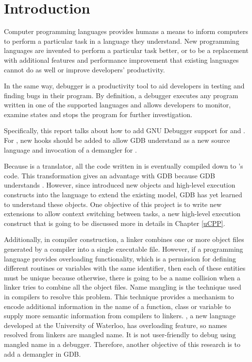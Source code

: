 \chapter{Introduction} \label{introduction}
Computer programming languages provides humans a means to inform computers to
perform a particular task in a language they understand. New programming languages are
invented to perform a particular task better, or to be a replacement with
additional features and performance improvement that existing languages cannot do as well or
improve developers' productivity.

In the same way, debugger is a productivity tool to aid developers in testing
and finding bugs in their program. By definition, a debugger executes
any program written in one of the supported languages and allows developers to
monitor, examine states and stops the program for further investigation.

Specifically, this report talks about how to add GNU Debugger support for \uCPPS
and \CFA.
For \CFA, new hooks should be added to allow GDB understand
\CFAS as a new source language and invocation of a demangler for \CFA.

Because \uCPPS is a translator, all the code written in \uCPPS is eventually
compiled down to \CC's code. This transformation gives \uCPPS an advantage with
GDB because GDB understands \CC. However, since \uCPPS introduced new objects
and high-level execution constructs into the language to extend the existing
model, GDB has yet learned to understand these objects. One objective of this
project is to write new extensions to allow context switching
between tasks, a new high-level execution construct that is going to be discussed more in
details in Chapter \ref{uCPP}.

Additionally, in compiler construction, a linker combines one or more object files generated
by a compiler into a single executable file. However, if a programming
language provides overloading functionality, which is a permission for defining different routines or variables with the
same identifier, then each of these entities must be unique because otherwise,
there is going to be a name collision when a linker tries to combine all the
object files. Name mangling is the technique used in compilers to resolve this
problem. This technique provides a mechanism to encode additional information in the
name of a function, class or variable to supply more semantic information from
compilers to linkers\cite{reference9}. \CFA, a new language developed at the University of
Waterloo, has overloading feature, so names resolved from
linkers are mangled name. It is not user-friendly to debug using mangled name in
a debugger. Therefore, another objective of this research is to add a \CFAS demangler in GDB.
